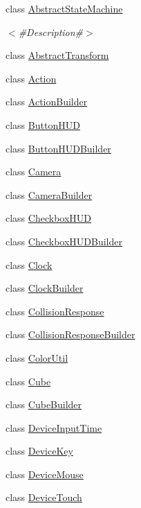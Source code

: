 \begin{DoxyCompactItemize}
class \mbox{\hyperlink{classnjli_1_1_abstract_state_machine}{Abstract\+State\+Machine}}
\begin{DoxyCompactList}\small\item\em $<$\#\+Description\#$>$ \end{DoxyCompactList}\item 
class \mbox{\hyperlink{classnjli_1_1_abstract_transform}{Abstract\+Transform}}
\item 
class \mbox{\hyperlink{classnjli_1_1_action}{Action}}
\item 
class \mbox{\hyperlink{classnjli_1_1_action_builder}{Action\+Builder}}
\item 
class \mbox{\hyperlink{classnjli_1_1_button_h_u_d}{Button\+H\+UD}}
\item 
class \mbox{\hyperlink{classnjli_1_1_button_h_u_d_builder}{Button\+H\+U\+D\+Builder}}
\item 
class \mbox{\hyperlink{classnjli_1_1_camera}{Camera}}
\item 
class \mbox{\hyperlink{classnjli_1_1_camera_builder}{Camera\+Builder}}
\item 
class \mbox{\hyperlink{classnjli_1_1_checkbox_h_u_d}{Checkbox\+H\+UD}}
\item 
class \mbox{\hyperlink{classnjli_1_1_checkbox_h_u_d_builder}{Checkbox\+H\+U\+D\+Builder}}
\item 
class \mbox{\hyperlink{classnjli_1_1_clock}{Clock}}
\item 
class \mbox{\hyperlink{classnjli_1_1_clock_builder}{Clock\+Builder}}
\item 
class \mbox{\hyperlink{classnjli_1_1_collision_response}{Collision\+Response}}
\item 
class \mbox{\hyperlink{classnjli_1_1_collision_response_builder}{Collision\+Response\+Builder}}
\item 
class \mbox{\hyperlink{classnjli_1_1_color_util}{Color\+Util}}
\item 
class \mbox{\hyperlink{classnjli_1_1_cube}{Cube}}
\item 
class \mbox{\hyperlink{classnjli_1_1_cube_builder}{Cube\+Builder}}
\item 
class \mbox{\hyperlink{classnjli_1_1_device_input_time}{Device\+Input\+Time}}
\item 
class \mbox{\hyperlink{classnjli_1_1_device_key}{Device\+Key}}
\item 
class \mbox{\hyperlink{classnjli_1_1_device_mouse}{Device\+Mouse}}
\item 
class \mbox{\hyperlink{classnjli_1_1_device_touch}{Device\+Touch}}

\end{DoxyCompactItemize}
